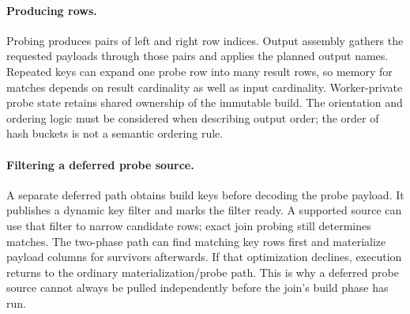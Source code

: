 \paragraph{Producing rows.}
Probing produces pairs of left and right row indices. Output assembly gathers
the requested payloads through those pairs and applies the planned output
names. Repeated keys can expand one probe row into many result rows, so memory
for matches depends on result cardinality as well as input cardinality.
Worker-private probe state retains shared ownership of the immutable build.
The orientation and ordering logic must be considered when describing output
order; the order of hash buckets is not a semantic ordering rule.

\paragraph{Filtering a deferred probe source.}
A separate deferred path obtains build keys before decoding the probe payload.
It publishes a dynamic key filter and marks the filter ready. A supported
source can use that filter to narrow candidate rows; exact join probing still
determines matches. The two-phase path can find matching key rows first and
materialize payload columns for survivors afterwards. If that optimization
declines, execution returns to the ordinary materialization/probe path. This
is why a deferred probe source cannot always be pulled independently before
the join's build phase has run.


